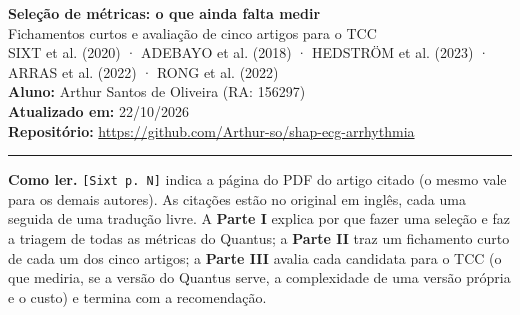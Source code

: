 \documentclass[11pt,a4paper]{article}
\begin{document}
\begin{center}
    {\LARGE \textbf{Seleção de métricas: o que ainda falta medir}} \\[0.35em]
    {\large Fichamentos curtos e avaliação de cinco artigos para o TCC} \\[0.3em]
    {\normalsize SIXT et al. (2020) · ADEBAYO et al. (2018) · HEDSTRÖM et al. (2023) · ARRAS et al. (2022) · RONG et al. (2022)} \\[0.3em]
    \textbf{Aluno:} Arthur Santos de Oliveira (RA: 156297) \\[0.2em]
    \textbf{Atualizado em:} 22/10/2026 \\[0.2em]
    \textbf{Repositório:} \url{https://github.com/Arthur-so/shap-ecg-arrhythmia}
\end{center}
\vspace{-0.5em}
\hrule
\vspace{0.8em}

\textbf{Como ler.} \texttt{[Sixt p. N]} indica a página do PDF do artigo citado (o mesmo vale para os demais autores). As citações estão no original em inglês, cada uma seguida de uma tradução livre. A \textbf{Parte I} explica por que fazer uma seleção e faz a triagem de todas as métricas do Quantus; a \textbf{Parte II} traz um fichamento curto de cada um dos cinco artigos; a \textbf{Parte III} avalia cada candidata para o TCC (o que mediria, se a versão do Quantus serve, a complexidade de uma versão própria e o custo) e termina com a recomendação.
\end{document}
